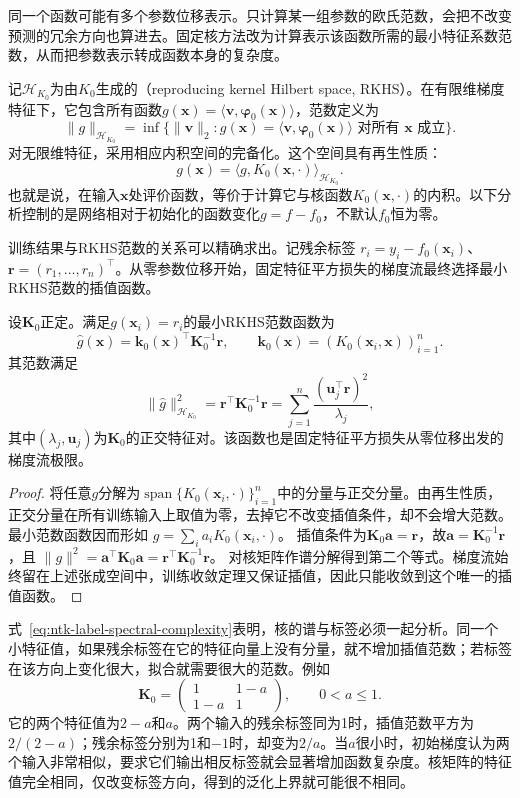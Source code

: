 同一个函数可能有多个参数位移表示。只计算某一组参数的欧氏范数，会把不改变预测的冗余方向也算进去。固定核方法改为计算表示该函数所需的最小特征系数范数，从而把参数表示转成函数本身的复杂度。

记$\mathcal H_{K_0}$为由$K_0$生成的（reproducing kernel Hilbert space, RKHS）。在有限维梯度特征下，它包含所有函数$g(\bm x)=\langle\bm v,\bm\varphi_0(\bm x)\rangle$，范数定义为
\[
 \|g\|_{\mathcal H_{K_0}}
 =\inf\{\|\bm v\|_2:g(\bm x)=\langle\bm v,\bm\varphi_0(\bm x)\rangle
                         \text{ 对所有 }\bm x\text{ 成立}\}.
\]
对无限维特征，采用相应内积空间的完备化。这个空间具有再生性质：
\[
 g(\bm x)=\langle g,K_0(\bm x,\cdot)\rangle_{\mathcal H_{K_0}}.
\]
也就是说，在输入$\bm x$处评价函数，等价于计算它与核函数$K_0(\bm x,\cdot)$的内积。以下分析控制的是网络相对于初始化的函数变化$g=f-f_0$，不默认$f_0$恒为零。

训练结果与RKHS范数的关系可以精确求出。记残余标签
$r_i=y_i-f_0(\bm x_i)$、$\bm r=(r_1,\ldots,r_n)^\top$。从零参数位移开始，固定特征平方损失的梯度流最终选择最小RKHS范数的插值函数。

\begin{theorem}[初始梯度特征的最小范数插值]
\label{thm:ntk-minimum-rkhs-norm}
设$\bm K_0$正定。满足$g(\bm x_i)=r_i$的最小RKHS范数函数为
\[
 \widehat g(\bm x)=\bm k_0(\bm x)^\top\bm K_0^{-1}\bm r,
 \qquad
 \bm k_0(\bm x)=(K_0(\bm x_i,\bm x))_{i=1}^{n}.
\]
其范数满足
\begin{equation}
 \|\widehat g\|_{\mathcal H_{K_0}}^2
 =\bm r^\top\bm K_0^{-1}\bm r
 =\sum_{j=1}^n\frac{(\bm u_j^\top\bm r)^2}{\lambda_j},
 \label{eq:ntk-label-spectral-complexity}
\end{equation}
其中$(\lambda_j,\bm u_j)$为$\bm K_0$的正交特征对。该函数也是固定特征平方损失从零位移出发的梯度流极限。
\end{theorem}
\begin{proof}
将任意$g$分解为$\operatorname{span}\{K_0(\bm x_i,\cdot)\}_{i=1}^n$中的分量与正交分量。由再生性质，正交分量在所有训练输入上取值为零，去掉它不改变插值条件，却不会增大范数。最小范数函数因而形如
$g=\sum_i a_iK_0(\bm x_i,\cdot)$。
插值条件为$\bm K_0\bm a=\bm r$，故$\bm a=\bm K_0^{-1}\bm r$，且
$\|g\|^2=\bm a^\top\bm K_0\bm a=\bm r^\top\bm K_0^{-1}\bm r$。
对核矩阵作谱分解得到第二个等式。梯度流始终留在上述张成空间中，训练收敛定理又保证插值，因此只能收敛到这个唯一的插值函数。
\end{proof}

式~\eqref{eq:ntk-label-spectral-complexity}表明，核的谱与标签必须一起分析。同一个小特征值，如果残余标签在它的特征向量上没有分量，就不增加插值范数；若标签在该方向上变化很大，拟合就需要很大的范数。例如
\[
 \bm K_0=\begin{pmatrix}1&1-a\\1-a&1\end{pmatrix},\qquad 0<a\leq1.
\]
它的两个特征值为$2-a$和$a$。两个输入的残余标签同为1时，插值范数平方为$2/(2-a)$；残余标签分别为1和$-1$时，却变为$2/a$。当$a$很小时，初始梯度认为两个输入非常相似，要求它们输出相反标签就会显著增加函数复杂度。核矩阵的特征值完全相同，仅改变标签方向，得到的泛化上界就可能很不相同。

